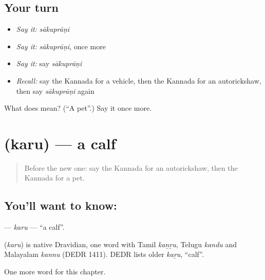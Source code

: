 \subsection*{Your turn}
\begin{itemize}
\raggedright
  \item \emph{Say it:} \emph{sākuprāṇi}
  \item \emph{Say it:} \emph{sākuprāṇi}, once more
  \item \emph{Say it:} say \emph{sākuprāṇi}
  \item \emph{Recall:} say the Kannada for a vehicle, then the Kannada for an autorickshaw, then say \emph{sākuprāṇi} again
\end{itemize}

\begin{tcolorbox}[breakable,colback=teal!4,colframe=teal!35!black,title={Before you move on}]
What does  mean? (\textquotedblleft{}A pet\textquotedblright{}.) Say it once more.
\end{tcolorbox}
\section[\texorpdfstring{\kn{ಕರು} (karu)}{ಕರು (karu)}]{ (karu) — a calf}

\label{lesson:KA-C261-karu}



\begin{quote}
Before the new one: say the Kannada for an autorickshaw, then the Kannada for a pet.
\end{quote}

\subsection*{You'll want to know: }
\textbf{} — \emph{karu} — \textquotedblleft{}a calf\textquotedblright{}.

\begin{cousinweb}
\textbf{} (\emph{karu}) is native Dravidian, one word with Tamil \emph{kaṉṟu}, Telugu \emph{kandu} and Malayalam \emph{kannu} (DEDR 1411). DEDR lists older \emph{kaṟu}, \textquotedblleft{}calf\textquotedblright{}.
\end{cousinweb}

\begin{grammarlens}[title={What you've built}]
One more word for this chapter.
\end{grammarlens}

